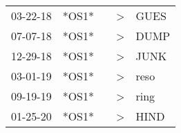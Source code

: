 \begin{supertabular}{p{0.07\textwidth}p{0.06\textwidth}p{0.02\textwidth}p{0.02\textwidth}p{0.06\textwidth}}
 03-22-18\textsuperscript{} &  *OS1* &   &  \textgreater &           GUES\textsuperscript{} \\
 07-07-18\textsuperscript{} &  *OS1* &   &  \textgreater &           DUMP\textsuperscript{} \\
 12-29-18\textsuperscript{} &  *OS1* &   &  \textgreater &           JUNK\textsuperscript{} \\
 03-01-19\textsuperscript{} &  *OS1* &   &  \textgreater &           reso\textsuperscript{} \\
 09-19-19\textsuperscript{} &  *OS1* &   &  \textgreater &           ring\textsuperscript{} \\
 01-25-20\textsuperscript{} &  *OS1* &   &  \textgreater &           HIND\textsuperscript{} \\
\end{supertabular}
